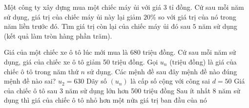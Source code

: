 \begin{bt}%
   
	Một công ty xây dựng mua một chiếc máy ủi với giá $3$ tỉ đồng. Cứ sau mỗi năm sử dụng, giá trị của chiếc máy ủi này lại giảm $20 \%$ so với giá trị của nó trong năm liền trước đó. Tìm giá trị còn lại của chiếc máy ủi đó sau $5$ năm sử dụng (kết quả làm tròn hàng phần trăm).
\end{bt}

\begin{ex}%
 
	Giá của một chiếc xe ô tô lúc mới mua là 680 triệu đồng. Cứ sau mỗi năm sử dụng, giá của chiếc xe ô tô giảm 50 triệu đồng. Gọi $u_n$ (triệu đồng) là giá của chiếc ô tô trong năm thứ $n$ sử dụng. Các mệnh đề sau đây mệnh đề nào đúng mệnh đề nào sai?
	\choiceTF
	{\True $ u_2=630$}
	{Dãy số $( u_n )$ là cấp số cộng với công sai $ d=50$}
	{\True Giá của chiếc ô tô sau 3 năm sử dụng lớn hơn 500 triệu đồng}
	{Sau ít nhất 8 năm sử dụng thì giá của chiếc ô tô nhỏ hơn một nửa giá trị ban đầu của nó}
\end{ex}

